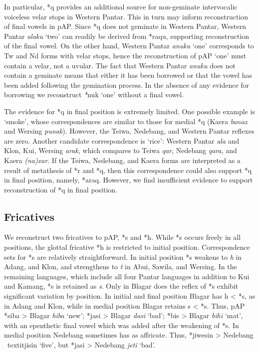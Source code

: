 In particular, *q provides an additional source for non-geminate intervocalic voiceless velar stops in Western Pantar. This in turn may inform reconstruction of final vowels in pAP. Since *q does not geminate in Western Pantar, Western Pantar \textit{alaku} `two' can readily be derived from *raqu, supporting reconstruction of the final vowel. On the other hand, Western Pantar \textit{anuku} `one' corresponds to Tw and Nd forms with velar stops, hence the reconstruction of pAP `one' must contain a velar, not a uvular. The fact that Western Pantar \textit{anuku }does not contain a geminate means that either it has been borrowed or that the vowel has been added following the gemination process. In the absence of any evidence for borrowing we reconstruct \textit{*}nuk `one' without a final vowel.

The evidence for *q in final position is extremely limited. One possible example is `smoke', whose correspondences are similar to those for medial *q (Kaera \textit{banax }and Wersing \textit{punak}). However, the Teiwa, Nedebang, and Western Pantar reflexes are zero. Another candidate correspondence is `rice': Western Pantar \textit{ala} and Klon, Kui, Wersing \textit{arak}, which compares to Teiwa \textit{qar}, Nedebang \textit{qara}, and Kaera \textit{(na)xar}. If the Teiwa, Nedebang, and Kaera forms are interpreted as a result of metathesis of *r and *q, then this correspondence could also support *q in final position, namely, *araq. However, we find insufficient evidence to support reconstruction of *q in final position.

\subsection{ Fricatives}
We reconstruct two fricatives to pAP, *s and *h. While *s occurs freely in all positions, the glottal fricative *h is restricted to initial position. Correspondence sets for *s are relatively straightforward. In initial position *s weakens to \textit{h} in Adang, and Klon, and strengthens to \textit{t} in Abui, Sawila, and Wersing. In the remaining languages, which include all four Pantar languages in addition to Kui and Kamang, *s is retained as \textit{s}. Only in Blagar does the reflex of *s exhibit significant variation by position. In initial and final position Blagar has h {\textless} *s, as in Adang and Klon, while in medial position Blagar retains s {\textless} *s. Thus, pAP *siba {\textgreater} Blagar \textit{hiba }`new'; *jasi {\textgreater} Blagar \textit{d{\textyogh}asi }`bad'; *bis {\textgreater} Blagar \textit{bihi} `mat', with an epenthetic final vowel which was added after the weakening of *s. In medial position Nedebang sometimes has as affricate. Thus, *jiwesin {\textgreater} Nedebang \
textit{jisin }`five', but *jasi {\textgreater} Nedebang \textit{jet{\textesh}i} `bad'. 

